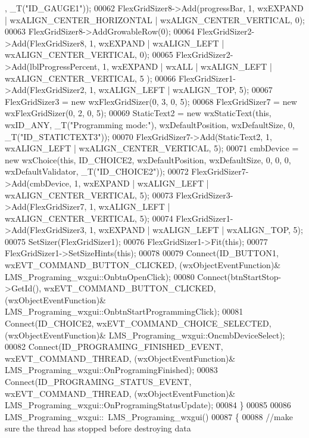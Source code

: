 \begin{DoxyCode}
      , _T(\textcolor{stringliteral}{"ID\_GAUGE1"}));
00062     FlexGridSizer8->Add(progressBar, 1, wxEXPAND | wxALIGN\_CENTER\_HORIZONTAL | wxALIGN\_CENTER\_VERTICAL, 0);
00063     FlexGridSizer8->AddGrowableRow(0);
00064     FlexGridSizer2->Add(FlexGridSizer8, 1, wxEXPAND | wxALIGN\_LEFT | wxALIGN\_CENTER\_VERTICAL, 0);
00065     FlexGridSizer2->Add(lblProgressPercent, 1, wxEXPAND | wxALL | wxALIGN\_LEFT | wxALIGN\_CENTER\_VERTICAL, 5
      );
00066     FlexGridSizer1->Add(FlexGridSizer2, 1, wxALIGN\_LEFT | wxALIGN\_TOP, 5);
00067     FlexGridSizer3 = \textcolor{keyword}{new} wxFlexGridSizer(0, 3, 0, 5);
00068     FlexGridSizer7 = \textcolor{keyword}{new} wxFlexGridSizer(0, 2, 0, 5);
00069     StaticText2 = \textcolor{keyword}{new} wxStaticText(\textcolor{keyword}{this}, wxID\_ANY, _T(\textcolor{stringliteral}{"Programming mode:"}), wxDefaultPosition, 
      wxDefaultSize, 0, _T(\textcolor{stringliteral}{"ID\_STATICTEXT3"}));
00070     FlexGridSizer7->Add(StaticText2, 1, wxALIGN\_LEFT | wxALIGN\_CENTER\_VERTICAL, 5);
00071     cmbDevice = \textcolor{keyword}{new} wxChoice(\textcolor{keyword}{this}, ID\_CHOICE2, wxDefaultPosition, wxDefaultSize, 0, 0, 0, 
      wxDefaultValidator, _T(\textcolor{stringliteral}{"ID\_CHOICE2"}));
00072     FlexGridSizer7->Add(cmbDevice, 1, wxEXPAND | wxALIGN\_LEFT | wxALIGN\_CENTER\_VERTICAL, 5);
00073     FlexGridSizer3->Add(FlexGridSizer7, 1, wxALIGN\_LEFT | wxALIGN\_CENTER\_VERTICAL, 5);
00074     FlexGridSizer1->Add(FlexGridSizer3, 1, wxEXPAND | wxALIGN\_LEFT | wxALIGN\_TOP, 5);
00075     SetSizer(FlexGridSizer1);
00076     FlexGridSizer1->Fit(\textcolor{keyword}{this});
00077     FlexGridSizer1->SetSizeHints(\textcolor{keyword}{this});
00078 
00079     Connect(ID\_BUTTON1, wxEVT\_COMMAND\_BUTTON\_CLICKED, (wxObjectEventFunction)&
      LMS_Programing_wxgui::OnbtnOpenClick);
00080     Connect(btnStartStop->GetId(), wxEVT\_COMMAND\_BUTTON\_CLICKED, (wxObjectEventFunction)&
      LMS_Programing_wxgui::OnbtnStartProgrammingClick);
00081     Connect(ID\_CHOICE2, wxEVT\_COMMAND\_CHOICE\_SELECTED, (wxObjectEventFunction)&
      LMS_Programing_wxgui::OncmbDeviceSelect);
00082     Connect(ID\_PROGRAMING\_FINISHED\_EVENT, wxEVT\_COMMAND\_THREAD, (wxObjectEventFunction)&
      LMS_Programing_wxgui::OnProgramingFinished);
00083     Connect(ID\_PROGRAMING\_STATUS\_EVENT, wxEVT\_COMMAND\_THREAD, (wxObjectEventFunction)&
      LMS_Programing_wxgui::OnProgramingStatusUpdate);
00084 \}
00085 
00086 LMS_Programing_wxgui::~LMS_Programing_wxgui()
00087 \{
00088     \textcolor{comment}{//make sure the thread has stopped before destroying data}

\end{DoxyCode}
